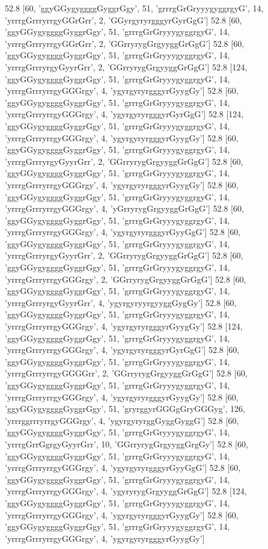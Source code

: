52.8 [60, 'ggyGGygyggggGyggrGgy', 51, 'grrrgGrGryyygyggrgyG', 14, 'yrrrgGrrryrrgyGGrGrr', 2, 'GGyrgyryrgggyrGyrGgG']
52.8 [60, 'ggyGGygyggggGyggrGgy', 51, 'grrrgGrGryyygyggrgyG', 14, 'yrrrgGrrryrrgyGGrGrr', 2, 'GGrryrygGrgyyggGrGgG']
52.8 [60, 'ggyGGygyggggGyggrGgy', 51, 'grrrgGrGryyygyggrgyG', 14, 'yrrrgGrrryrgyGyyrGrr', 2, 'GGrryrygGrgyyggGrGgG']
52.8 [124, 'ggyGGygyggggGyggrGgy', 51, 'grrrgGrGryyygyggrgyG', 14, 'yrrrgGrrryrrgyGGGrgy', 4, 'ygyrgyryrgggyrGyygGy']
52.8 [60, 'ggyGGygyggggGyggrGgy', 51, 'grrrgGrGryyygyggrgyG', 14, 'yrrrgGrrryrrgyGGGrgy', 4, 'ygyrgyryrgggyrGyrGgG']
52.8 [124, 'ggyGGygyggggGyggrGgy', 51, 'grrrgGrGryyygyggrgyG', 14, 'yrrrgGrrryrrgyGGGrgy', 4, 'ygyrgyryrgggyrGyygGy']
52.8 [60, 'ggyGGygyggggGyggrGgy', 51, 'grrrgGrGryyygyggrgyG', 14, 'yrrrgGrrryrgyGyyrGrr', 2, 'GGrryrygGrgyyggGrGgG']
52.8 [60, 'ggyGGygyggggGyggrGgy', 51, 'grrrgGrGryyygyggrgyG', 14, 'yrrrgGrrryrrgyGGGrgy', 4, 'ygyrgyryrgggyrGyygGy']
52.8 [60, 'ggyGGygyggggGyggrGgy', 51, 'grrrgGrGryyygyggrgyG', 14, 'yrrrgGrrryrrgyGGGrgy', 4, 'yGrryrygGrgyyggGrGgG']
52.8 [60, 'ggyGGygyggggGyggrGgy', 51, 'grrrgGrGryyygyggrgyG', 14, 'yrrrgGrrryrrgyGGGrgy', 4, 'ygyrgyryrgggyrGyyGgG']
52.8 [60, 'ggyGGygyggggGyggrGgy', 51, 'grrrgGrGryyygyggrgyG', 14, 'yrrrgGrrryrgyGyyrGrr', 2, 'GGrryrygGrgyyggGrGgG']
52.8 [60, 'ggyGGygyggggGyggrGgy', 51, 'grrrgGrGryyygyggrgyG', 14, 'yrrrgGrrryrrgyGGGrgy', 2, 'GGrryrygGrgyyggGrGgG']
52.8 [60, 'ggyGGygyggggGyggrGgy', 51, 'grrrgGrGryyygyggrgyG', 14, 'yrrrgGrrryrgyGyyrGrr', 4, 'ygyrgyryyrgyyggGygGy']
52.8 [60, 'ggyGGygyggggGyggrGgy', 51, 'grrrgGrGryyygyggrgyG', 14, 'yrrrgGrrryrrgyGGGrgy', 4, 'ygyrgyryrgggyrGyygGy']
52.8 [124, 'ggyGGygyggggGyggrGgy', 51, 'grrrgGrGryyygyggrgyG', 14, 'yrrrgGrrryrrgyGGGrgy', 4, 'ygyrgyryrgggyrGyrGgG']
52.8 [60, 'ggyGGygyggggGyggrGgy', 51, 'grrrgGrGryyygyggrgyG', 14, 'yrrrgGrrryrrgyGGGGrr', 2, 'GGrryrygGrgyyggGrGgG']
52.8 [60, 'ggyGGygyggggGyggrGgy', 51, 'grrrgGrGryyygyggrgyG', 14, 'yrrrgGrrryrrgyGGGrgy', 4, 'ygyrgyryrgggyrGyygGy']
52.8 [60, 'ggyGGygyggggGyggrGgy', 51, 'gryrggyrGGGgGryGGGyg', 126, 'yrrrggrrryrrgyGGGrgy', 4, 'ygyrgyryrggGyggGyggG']
52.8 [60, 'ggyGGygyggggGyggrGgy', 51, 'grrrgGrGryyygyggrgyG', 14, 'yrrrgGrrGgrgyGyyrGrr', 10, 'GGrryrygGrgyyggGrgGy']
52.8 [60, 'ggyGGygyggggGyggrGgy', 51, 'grrrgGrGryyygyggrgyG', 14, 'yrrrgGrrryrrgyGGGrgy', 4, 'ygyrgyryrgggyrGyyGgG']
52.8 [60, 'ggyGGygyggggGyggrGgy', 51, 'grrrgGrGryyygyggrgyG', 14, 'yrrrgGrrryrrgyGGGrgy', 4, 'ygyryrygGrgyyggGrGgG']
52.8 [124, 'ggyGGygyggggGyggrGgy', 51, 'grrrgGrGryyygyggrgyG', 14, 'yrrrgGrrryrrgyGGGrgy', 4, 'ygyrgyryrgggyrGyygGy']
52.8 [60, 'ggyGGygyggggGyggrGgy', 51, 'grrrgGrGryyygyggrgyG', 14, 'yrrrgGrrryrrgyGGGrgy', 4, 'ygyrgyryrgggyrGyygGy']

